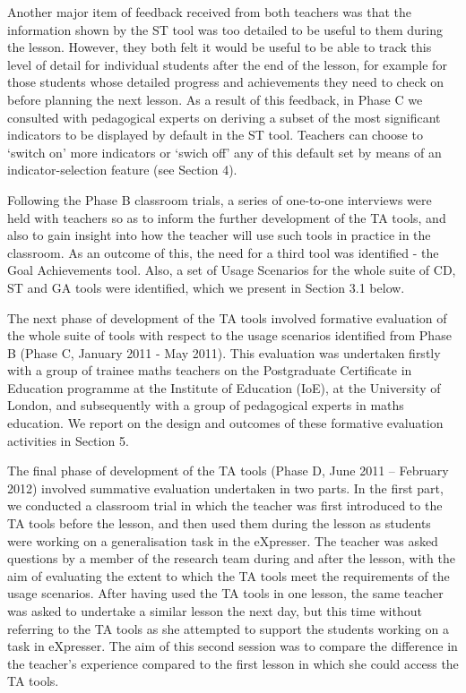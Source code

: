 Another major item of feedback received from both teachers was that
the information shown by the ST tool was too detailed to be useful to
them during the lesson. However, they both felt it would be useful to
be able to track this level of detail for individual students after
the end of the lesson, for example for those students whose detailed
progress and achievements they need to check on before planning the
next lesson. As a result of this feedback, in Phase C we consulted
with pedagogical experts on deriving a subset of the most significant
indicators to be displayed by default in the ST tool. Teachers can
choose to `switch on' more indicators or `swich off' any of this
default set by means of an indicator-selection feature (see Section
4).

Following the Phase B classroom trials, a series of one-to-one
interviews were held with teachers so as to inform the further
development of the TA tools, and also to gain insight into how the
teacher will use such tools in practice in the classroom. As an
outcome of this, the need for a third tool was identified - the Goal
Achievements tool. Also, a set of Usage Scenarios for the whole suite
of CD, ST and GA tools were identified, which we present in Section
3.1 below.

The next phase of development of the TA tools involved formative
evaluation of the whole suite of tools with respect to the usage
scenarios identified from Phase B (Phase C, January 2011 - May
2011). This evaluation was undertaken firstly with a group of trainee
maths teachers on the Postgraduate Certificate in Education programme
at the Institute of Education (IoE), at the University of London, and
subsequently with a group of pedagogical experts in maths
education. We report on the design and outcomes of these formative
evaluation activities in Section 5.
 
The final phase of development of the TA tools (Phase D, June 2011 –
February 2012) involved summative evaluation undertaken in two
parts. In the first part, we conducted a classroom trial in which the
teacher was first introduced to the TA tools before the lesson, and
then used them during the lesson as students were working on a
generalisation task in the eXpresser. The teacher was asked questions
by a member of the research team during and after the lesson, with the
aim of evaluating the extent to which the TA tools meet the
requirements of the usage scenarios. After having used the TA tools in
one lesson, the same teacher was asked to undertake a similar lesson
the next day, but this time without referring to the TA tools as she
attempted to support the students working on a task in eXpresser. The
aim of this second session was to compare the difference in the
teacher’s experience compared to the first lesson in which she could
access the TA tools.
 
